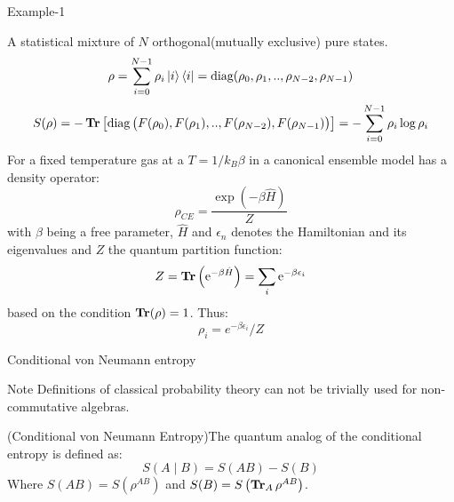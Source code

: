 \documentclass{beamer}
\begin{document}
\begin{frame}{Example-1}
\begin{scriptsize}
A statistical mixture of $N$ orthogonal(mutually exclusive) pure states.
\begin{equation*}
\rho = \sum_{i=0}^{N-1}\rho_{i}\ket{i}\bra{i}= \operatorname{\textup{diag}}  (\rho_{0},\rho_{1},..,\rho_{N-2},\rho_{N-1})
\end{equation*}
\begin{equation*}
S(\rho) = -\operatorname{\textup{\textbf{Tr}}} \left[ \operatorname{\textup{diag}} \big( F(\rho_{0}),F(\rho_{1}),..,F(\rho_{N-2}),F(\rho_{N-1})
 \big) \right]= -\sum_{i=0}^{N-1}\rho_{i} \log \rho_{i} 
\end{equation*}
For a fixed temperature gas at a $T=1 / k_{B} \beta$ in a canonical ensemble model has a density operator:
\begin{equation*}
\rho_{CE}=\frac{\exp (-\beta \hat{H})}{Z}
\end{equation*}
with $\beta$ being a free parameter, $\hat{H}$ and  $\epsilon_{n}$ denotes the Hamiltonian and its eigenvalues and $Z$ the quantum partition function:
\begin{equation*}
Z=\operatorname{\textup{\textbf{Tr}}}\left(\mathrm{e}^{-\beta \hat{H}}\right)=\sum_{i} \mathrm{e}^{-\beta \epsilon_{i}}
\end{equation*}
based on the condition $\operatorname{\textup{\textbf{Tr}}}(\rho)=1$. Thus:
\begin{equation*}
\rho_{i}= e^{-\beta \epsilon_{i}}/Z
\end{equation*}
\end{scriptsize}
\end{frame}

\begin{frame}{Conditional von Neumann entropy}
\begin{alertblock}{Note}
Definitions of classical probability theory can not be trivially used for non-commutative algebras.
\end{alertblock}
\begin{definition}(Conditional von Neumann Entropy)The quantum analog of the conditional entropy is defined as:
\begin{equation*}
S(A \mid B) = S(A B)-S(B)
\end{equation*}
Where $S(A B)=S(\rho^{A B})$ and
$S(B)= S\left(\operatorname{\textup{\textbf{Tr}}}_{A} \rho^{A B}\right)$.
\end{definition}
\end{frame}
\end{document}
